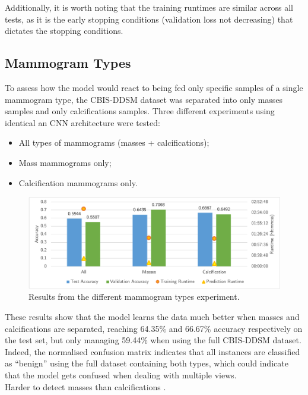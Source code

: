 Additionally, it is worth noting that the training runtimes are similar across all tests, as it is the early stopping conditions (validation loss not decreasing) that dictates the stopping conditions.

\subsection{Mammogram Types}

To assess how the model would react to being fed only specific samples of a single mammogram type, the CBIS-DDSM dataset was separated into only masses samples and only calcifications samples. Three different experiments using identical an CNN architecture were tested:
\begin{itemize}
    \item All types of mammograms (masses + calcifications);
    \item Mass mammograms only;
    \item Calcification mammograms only.
\end{itemize}

\begin{figure}[ht]
\centerline{\includegraphics[width=\textwidth]{figures/evaluation/individual/mammogram_types_results.png}}
\caption{\label{fig:evaluation-individual-mammogram_types_results}Results from the different mammogram types experiment.}
\end{figure}

These results show that the model learns the data much better when masses and calcifications are separated, reaching 64.35\% and 66.67\% accuracy respectively on the test set, but only managing 59.44\% when using the full CBIS-DDSM dataset. Indeed, the normalised confusion matrix indicates that all instances are classified as ``benign'' using the full dataset containing both types, which could indicate that the model gets confused when dealing with multiple views.\\

Harder to  detect masses than calcifications \citep{Elter2009}.